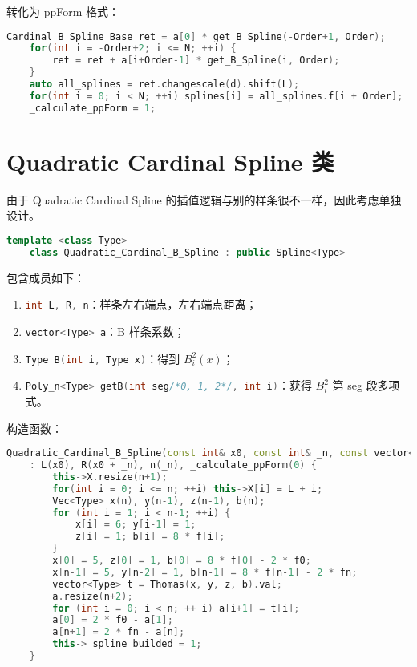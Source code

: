 \documentclass[lang=cn,a4paper,newtx,bibend=bibtex]{elegantpaper}
\newcommand{\LII}{\lstinline[language=C++]}
\begin{document}
转化为 ppForm 格式：

\begin{lstlisting}[language=C++]
    Cardinal_B_Spline_Base ret = a[0] * get_B_Spline(-Order+1, Order);
    for(int i = -Order+2; i <= N; ++i) {
        ret = ret + a[i+Order-1] * get_B_Spline(i, Order);
    }
    auto all_splines = ret.changescale(d).shift(L);
    for(int i = 0; i < N; ++i) splines[i] = all_splines.f[i + Order];
    _calculate_ppForm = 1;
\end{lstlisting}

\section{Quadratic Cardinal Spline 类}

由于 Quadratic Cardinal Spline 的插值逻辑与别的样条很不一样，因此考虑单独设计。

\begin{lstlisting}[language=C++]
    template <class Type>
    class Quadratic_Cardinal_B_Spline : public Spline<Type>
\end{lstlisting}

包含成员如下：
\begin{enumerate}
\item \LII{int L, R, n}：样条左右端点，左右端点距离；
\item \LII{vector<Type> a}：B 样条系数；
\item \LII{Type B(int i, Type x)}：得到 $B_i^2(x)$；
\item \LII{Poly_n<Type> getB(int seg/*0, 1, 2*/, int i)}：获得 $B_i^2$ 第 seg 段多项式。
\end{enumerate}

构造函数：

\begin{lstlisting}[language=C++]
    Quadratic_Cardinal_B_Spline(const int& x0, const int& _n, const vector<Type>& f, const Type& f0, const Type& fn) 
	: L(x0), R(x0 + _n), n(_n), _calculate_ppForm(0) {
		this->X.resize(n+1);
		for(int i = 0; i <= n; ++i) this->X[i] = L + i;
		Vec<Type> x(n), y(n-1), z(n-1), b(n);
		for (int i = 1; i < n-1; ++i) {
			x[i] = 6; y[i-1] = 1;
			z[i] = 1; b[i] = 8 * f[i];
		}
		x[0] = 5, z[0] = 1, b[0] = 8 * f[0] - 2 * f0;
		x[n-1] = 5, y[n-2] = 1, b[n-1] = 8 * f[n-1] - 2 * fn;
		vector<Type> t = Thomas(x, y, z, b).val;
		a.resize(n+2);
		for (int i = 0; i < n; ++ i) a[i+1] = t[i];
		a[0] = 2 * f0 - a[1];
		a[n+1] = 2 * fn - a[n];
		this->_spline_builded = 1;
	}
\end{lstlisting}
\end{document}
